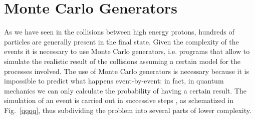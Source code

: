 \chapter{Monte Carlo Generators}
\thispagestyle{empty}

As we have seen in the collisions between high energy protons, hundreds of particles are generally present in the final state.
Given the complexity of the events it is necessary to use Monte Carlo generators, i.e. programs that allow to simulate the realistic result of the collisions assuming a certain model for the processes involved. 
The use of Monte Carlo generators is necessary because it is impossible to predict what happens event-by-event: in fact,  in quantum mechanics we can only calculate the probability of having a certain result.
The simulation of an event is carried out in successive steps \cite{Sjostrand:2006su, Buckley:2011ms}, as schematized in Fig.~\ref{qqqq}, thus subdividing the problem into several parts of lower complexity.


